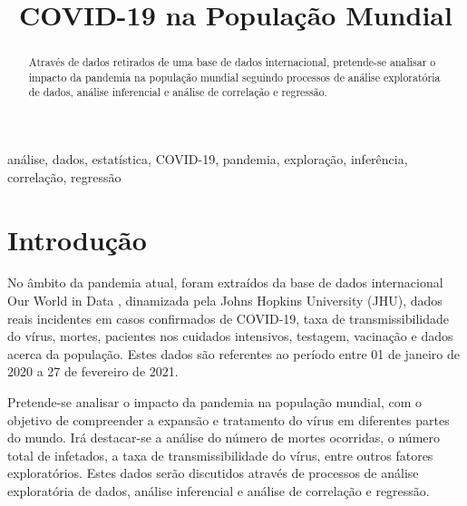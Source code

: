 \documentclass[conference]{IEEEtran}
\begin{document}
\title{COVID-19 na População Mundial\\
}

\author{
\and
{}
}

\maketitle

\begin{abstract}
Através de dados retirados de uma base de dados internacional, pretende-se analisar o impacto da pandemia na população mundial seguindo processos de análise exploratória de dados, análise inferencial e análise de correlação e regressão.
\end{abstract}

\begin{IEEEkeywords}
análise, dados, estatística, COVID-19, pandemia, exploração, inferência, correlação, regressão
\end{IEEEkeywords}

\section{Introdução} 
No âmbito da pandemia atual, foram extraídos da base de dados internacional Our World in Data \cite{database}, dinamizada pela Johns Hopkins University (JHU), dados reais incidentes em casos confirmados de COVID-19, taxa de transmissibilidade do vírus, mortes, pacientes nos cuidados intensivos, testagem, vacinação e dados acerca da população. Estes dados são referentes ao período entre 01 de janeiro de 2020 a 27 de fevereiro de 2021.

Pretende-se analisar o impacto da pandemia na população mundial, com o objetivo de compreender a expansão e tratamento do vírus em diferentes partes do mundo. Irá destacar-se a análise do número de mortes ocorridas, o número total de infetados, a taxa de transmissibilidade do vírus, entre outros fatores exploratórios. Estes dados serão discutidos através de processos de análise exploratória de dados, análise inferencial e análise de correlação e regressão.
\end{document}
